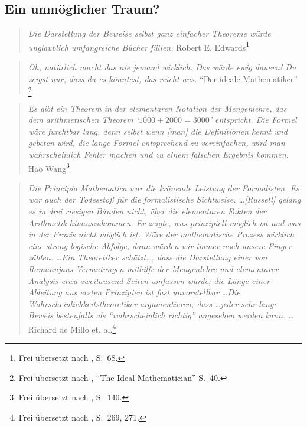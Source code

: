 \subsection{Ein unmöglicher Traum?}\label{dream}

\begin{quote}
  {\em Die Darstellung der Beweise selbst ganz einfacher Theoreme würde unglaublich umfangreiche Bücher füllen.}
    \flushright\sc  Robert E. Edwards\footnote{Frei übersetzt nach \cite{Edwards}, S.~68.}\\
\end{quote}

\begin{quote}
  {\em Oh, natürlich {\em macht} das nie jemand wirklich.  Das würde ewig dauern!  Du zeigst nur, dass du es könntest, das reicht aus.}
    \flushright\sc  "`Der ideale Mathematiker"'
    \footnote{Frei übersetzt nach \cite{Davis},
\sc  "`The Ideal Mathematician"' S.~40.}\\
\end{quote}

\begin{quote}
  {\em Es gibt ein Theorem in der elementaren Notation der Mengenlehre, das dem arithmetischen Theorem `$1000+2000=3000$' entspricht.  Die Formel wäre furchtbar lang, denn selbst wenn [man] die Definitionen kennt und gebeten wird, die lange Formel entsprechend zu vereinfachen, wird man wahrscheinlich Fehler machen und zu einem falschen Ergebnis kommen.}
    \flushright\sc  Hao Wang\footnote{Frei übersetzt nach \cite{Wang}, S.~140.}\\
\end{quote}

\vspace{-0.5em}

\begin{quote}
  {\em {\em Die Principia Mathematica} war die krönende Leistung der Formalisten.  Es war auch der Todesstoß für die formalistische Sichtweise. \ldots {[Rus\-sell]} gelang es in drei riesigen Bänden nicht, über die elementaren Fakten der Arithmetik hinauszukommen.  Er zeigte, was prinzipiell möglich ist und was in der Praxis nicht möglich ist.  Wäre der mathematische Prozess wirklich eine streng logische Abfolge, dann würden wir immer noch unsere Finger zählen. \ldots Ein Theoretiker schätzt\ldots, dass die Darstellung einer von Ramanujans Vermutungen mithilfe der Mengenlehre und elementarer Analysis etwa zweitausend Seiten umfassen würde; die Länge einer Ableitung aus ersten Prinzipien ist fast unvorstellbar \ldots Die Wahrscheinlichkeitstheoretiker argumentieren, dass \ldots jeder sehr lange Beweis bestenfalls als "`wahrscheinlich richtig"' angesehen werden kann. \ldots}
  \flushright\sc Richard de Millo et. al.\footnote{Frei übersetzt nach \cite{deMillo}, S.~269,
  271.}\\
\end{quote}

